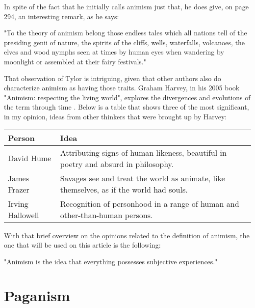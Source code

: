 In spite of the fact that he initially calls animism just that, he does give, on page 294, an interesting
remark, as he says:

\begin{center}
    \itshape
    \parbox{0.7\textwidth}{
    "To the theory of animism belong those endless tales which all nations tell of the presiding genii
    of nature, the spirits of the cliffs, wells, waterfalls, volcanoes, the elves and wood nymphs seen
    at times by human eyes when wandering by moonlight or assembled at their fairy festivals." 
    }
\end{center}

That observation of Tylor is intriguing, given that other authors also do characterize animism
as having those traits. Graham Harvey, in his 2005 book "Animism: respecting the living world", explores
the divergences and evolutions of the term through time \cite{Harvey2005}. Below is a table that shows
three of the most significant, in my opinion, ideas from other thinkers that were brought up by Harvey:

\begin{center}
    \begin{tabularx}{\textwidth}{||>{\raggedright\arraybackslash}X|>{\raggedleft\arraybackslash}X||} 
     \hline
     Person & Idea \\ [0.5ex] 
     \hline\hline
     David Hume & Attributing signs of human likeness, beautiful in poetry and absurd in philosophy. \\ 
     \hline
     James Frazer & Savages see and treat the world as animate, like themselves, as if the world had souls.\\
     \hline
     Irving Hallowell & Recognition of personhood in a range of human and other-than-human persons. \\ [1ex]
     \hline
    \end{tabularx}
\end{center}

With that brief overview on the opinions related to the definition of animism, the one that will be used
on this article is the following:

\begin{center}
    \itshape
    \parbox{0.7\textwidth}{
    "Animism is the idea that everything possesses subjective experiences." 
    }
\end{center}

\section{Paganism}

